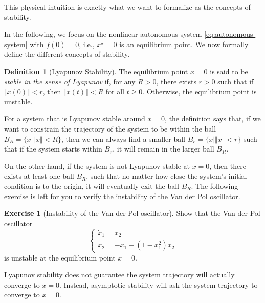 \documentclass[
]{book}
\theoremstyle{definition}
\newtheorem{definition}{Definition}[chapter]
\theoremstyle{definition}
\theoremstyle{definition}
\newtheorem{exercise}{Exercise}[chapter]
\theoremstyle{definition}
\theoremstyle{remark}
\begin{document}
This physical intuition is exactly what we want to formalize as the concepts of stability.

In the following, we focus on the nonlinear autonomous system \eqref{eq:autonomous-system} with \(f(0) = 0\), i.e., \(x^\star = 0\) is an equilibrium point. We now formally define the different concepts of stability.

\begin{definition}[Lyapunov Stability]
\protect\hypertarget{def:lyapunovstability}{}\label{def:lyapunovstability}The equilibrium point \(x=0\) is said to be \emph{stable in the sense of Lyapunov} if, for any \(R > 0\), there exists \(r >0\) such that if \(\Vert x(0) \Vert < r\), then \(\Vert x(t) \Vert < R\) for all \(t \geq 0\). Otherwise, the equilibrium point is unstable.
\end{definition}

For a system that is Lyapunov stable around \(x=0\), the definition says that, if we want to constrain the trajectory of the system to be within the ball \(B_R = \{ x \mid \Vert x \Vert < R \}\), then we can always find a smaller ball \(B_r = \{ x \mid \Vert x \Vert < r \}\) such that if the system starts within \(B_r\), it will remain in the larger ball \(B_R\).

On the other hand, if the system is not Lyapunov stable at \(x=0\), then there exists at least one ball \(B_R\), such that no matter how close the system's initial condition is to the origin, it will eventually exit the ball \(B_R\). The following exercise is left for you to verify the instability of the Van der Pol oscillator.

\begin{exercise}[Instability of the Van der Pol oscillator]
\protect\hypertarget{exr:instabilityvanderpol}{}\label{exr:instabilityvanderpol}Show that the Van der Pol oscillator
\[
\begin{cases}
\dot{x}_1 = x_2 \\
\dot{x}_2 = - x_1 + (1-x_1^2) x_2
\end{cases}
\]
is unstable at the equilibrium point \(x = 0\).
\end{exercise}

Lyapunov stability does not guarantee the system trajectory will actually converge to \(x =0\). Instead, asymptotic stability will ask the system trajectory to converge to \(x=0\).
\end{document}
